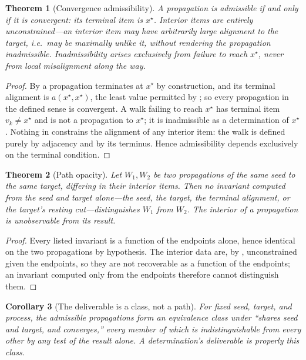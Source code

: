 \documentclass[11pt,twocolumn,a4paper]{article}
\theoremstyle{dirthm}
\newtheorem{theorem}{Theorem}[section]
\newtheorem{corollary}[theorem]{Corollary}
\theoremstyle{definition}
\theoremstyle{remark}
\newcommand{\al}{a}
\newcommand{\Walk}{W}
\begin{document}
\begin{theorem}[Convergence admissibility]
\label{thm:admissibility}
A propagation is \emph{admissible} if and only if it is convergent: its
terminal item is $x^{\star}$. Interior items are entirely unconstrained---an
interior item may have arbitrarily large alignment to the target, i.e.\ may be
maximally unlike it, without rendering the propagation inadmissible.
Inadmissibility arises exclusively from failure to reach $x^{\star}$, never
from local misalignment along the way.
\end{theorem}

\begin{proof}
By  a propagation terminates at $x^{\star}$ by construction,
and its terminal alignment is $\al(x^{\star},x^{\star})$, the least value
permitted by ; so every propagation in the defined sense
is convergent. A walk failing to reach $x^{\star}$ has terminal item
$v_k\neq x^{\star}$ and is not a propagation to $x^{\star}$; it is
inadmissible as a determination of $x^{\star}$. Nothing in 
constrains the alignment of any interior item: the walk is defined purely by
adjacency and by its terminus. Hence admissibility depends exclusively on the
terminal condition.
\end{proof}

\begin{theorem}[Path opacity]
\label{thm:path-opacity}
Let $\Walk_1,\Walk_2$ be two propagations of the same seed to the same target,
differing in their interior items. Then no invariant computed from the seed
and target alone---the seed, the target, the terminal alignment, or the
target's resting cut---distinguishes $\Walk_1$ from $\Walk_2$. The interior of
a propagation is unobservable from its result.
\end{theorem}

\begin{proof}
Every listed invariant is a function of the endpoints alone, hence identical
on the two propagations by hypothesis. The interior data are, by
, unconstrained given the endpoints, so they are not
recoverable as a function of the endpoints; an invariant computed only from
the endpoints therefore cannot distinguish them.
\end{proof}

\begin{corollary}[The deliverable is a class, not a path]
\label{cor:gauge}
For fixed seed, target, and process, the admissible propagations form an
equivalence class under ``shares seed and target, and converges,'' every
member of which is indistinguishable from every other by any test of the
result alone. A determination's deliverable is properly this class.
\end{corollary}
\end{document}
